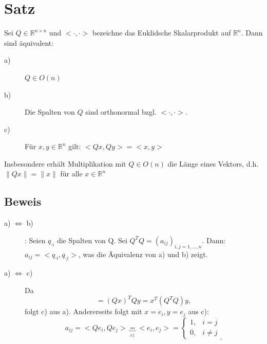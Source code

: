 \documentclass{scrbook}
\begin{document}
\section{Satz}
Sei $Q \in \mathbb{R}^{n\times n}$ und $<\cdot,\cdot>$ bezeichne das Euklidsche Skalarprodukt auf $\mathbb{R}^n$. Dann sind äquivalent:
\begin{description}
\item[a)] $Q\in O(n)$
\item[b)] Die Spalten von $Q$ sind orthonormal bzgl. $<\cdot,\cdot>$.
\item[c)] Für $x,y \in \mathbb{R}^n$ gilt: $<Qx,Qy> = <x,y>$
\end{description}
Insbesondere erhält Multiplikation mit $Q\in O(n)$ die Länge eines Vektors, d.h. $\| Qx\| = \|x\|$ für alle $x \in \mathbb{R}^n$
\subsection*{Beweis}
\begin{description}
\item[a) $\Leftrightarrow$ b)]: Seien $q_{\cdot i}$ die Spalten von Q. Sei $Q^TQ = (a_{ij})_{i,j=1,...,n}$. Dann: $a_{ij} = <q_{\cdot i},q_{\cdot j}>$, was die Äquivalenz von a) und b) zeigt.
\item[a) $\Leftrightarrow$ c)] Da
\[<Qx,Qy> = (Qx)^TQy = x^T(Q^TQ)y,\]
folgt c) aus a). Andererseits folgt mit $x = e_i, y = e_j$ aus c):
\[a_{ij} = <Qe_i,Qe_j> \underbrace{=}_{c)} <e_i,e_j> = 
\left\{
\begin{array}{cl}
1,&i=j\\
0,&i\neq j
\end{array}
\right.
_\square
 \]
\end{description}
\end{document}
